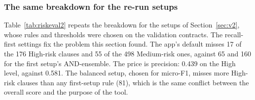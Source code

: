 \subsubsection{The same breakdown for the re-run setups}
Table~\ref{tab:riskeval2} repeats the breakdown for the setups of Section~\ref{sec:v2}, whose rules and thresholds were chosen on the validation contracts. The recall-first settings fix the problem this section found. The app's default misses 17 of the 176 High-risk clauses and 55 of the 498 Medium-risk ones, against 65 and 160 for the first setup's AND-ensemble. The price is precision: 0.439 on the High level, against 0.581. The balanced setup, chosen for micro-F1, misses more High-risk clauses than any first-setup rule (81), which is the same conflict between the overall score and the purpose of the tool.


